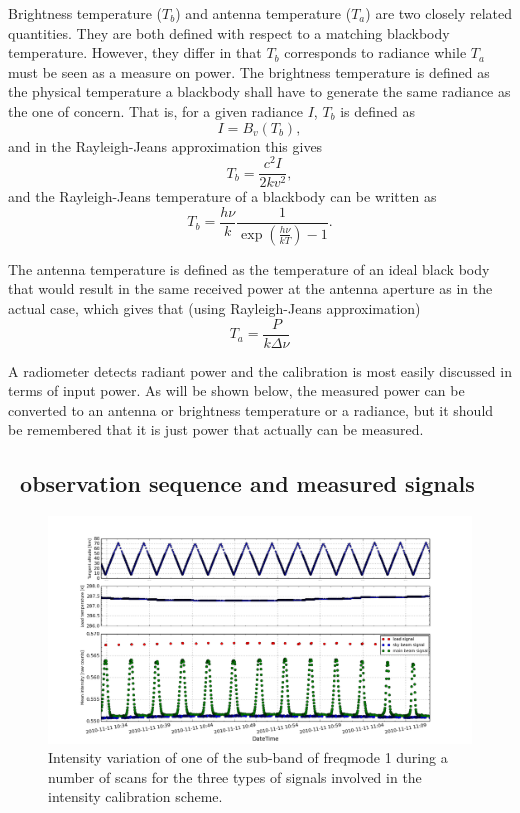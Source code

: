 Brightness temperature (\(T_{b}\)) and antenna temperature (\(T_{a}\))
are two closely related quantities. They are both defined with respect to a 
matching blackbody temperature. However, they differ in that \(T_{b}\) corresponds 
to radiance while \(T_{a}\) must be seen as a measure on power.
The brightness temperature is defined as the physical temperature 
a blackbody shall have to generate the same radiance as the one of concern.
That is, for a given radiance \(I\), \(T_{b}\) is defined as
\begin{equation}
 I = B_{v}(T_{b}),
\end{equation}
and in the Rayleigh-Jeans approximation this gives
\begin{equation}
 T_{b} = \frac{c^{2}I}{2kv^{2}},
\end{equation}
and the Rayleigh-Jeans temperature of a blackbody can be written as 
\begin{equation}
 T_{b} = \frac{h\nu}{k}\frac{1}{\exp(\frac{h\nu}{kT})-1}.  
\end{equation}


The antenna temperature is defined as the temperature of an ideal black
body that would result in the same received power at the antenna aperture 
as in the actual case, which gives that (using Rayleigh-Jeans approximation)
\begin{equation}
T_{a} = \frac{P}{k\Delta \nu}
\end{equation}

A radiometer detects radiant power and the calibration is most 
easily discussed in terms of input power. As will be shown below, 
the measured power can be converted to an
antenna or brightness temperature or a radiance, but it should be 
remembered that it is just power that actually can be measured.


\subsection{\smr\ observation sequence and measured signals} 
\label{sec:smrobs}

\begin{figure}[t]
\includegraphics[width=14cm]{cal_signals.png}
\caption{ Intensity variation of one of the sub-band of freqmode 1
during a number of scans for the three types of signals involved
in the intensity calibration scheme.}
\label{fig:intensityvar}
\end{figure}



